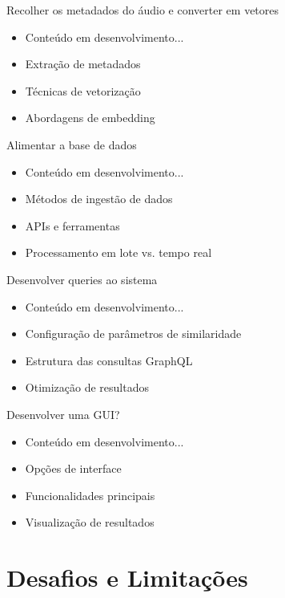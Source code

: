 \documentclass{beamer}
\begin{document}
\begin{frame}{Recolher os metadados do áudio e converter em vetores}
    \begin{itemize}
        \item Conteúdo em desenvolvimento...
        \item Extração de metadados
        \item Técnicas de vetorização
        \item Abordagens de embedding
    \end{itemize}
\end{frame}

\begin{frame}{Alimentar a base de dados}
    \begin{itemize}
        \item Conteúdo em desenvolvimento...
        \item Métodos de ingestão de dados
        \item APIs e ferramentas
        \item Processamento em lote vs. tempo real
    \end{itemize}
\end{frame}

\begin{frame}{Desenvolver queries ao sistema}
    \begin{itemize}
        \item Conteúdo em desenvolvimento...
        \item Configuração de parâmetros de similaridade
        \item Estrutura das consultas GraphQL
        \item Otimização de resultados
    \end{itemize}
\end{frame}

\begin{frame}{Desenvolver uma GUI?}
    \begin{itemize}
        \item Conteúdo em desenvolvimento...
        \item Opções de interface
        \item Funcionalidades principais
        \item Visualização de resultados
    \end{itemize}
\end{frame}

\section{Desafios e Limitações}
\end{document}
